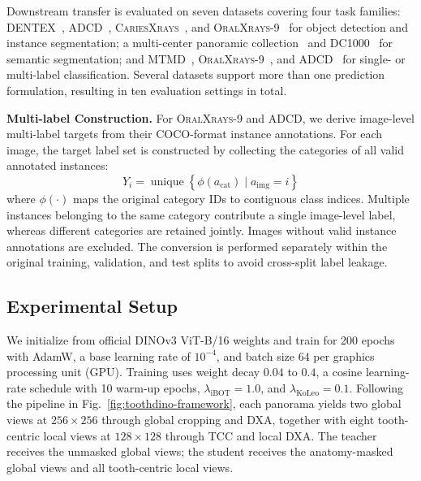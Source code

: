 \documentclass[conference]{IEEEtran}
\newcommand{\DXA}{\textsc{DXA}}
\newcommand{\TCC}{\textsc{TCC}}
\newcommand{\dataset}[1]{\textsc{#1}}
\begin{document}
Downstream transfer is evaluated on seven datasets covering four task families: \dataset{DENTEX}~\cite{hamamci2023dentex}, \dataset{ADCD}~\cite{muresanu2024adcd}, \dataset{CariesXrays}~\cite{chen2024cariesxrays}, and \dataset{OralXrays-9}~\cite{chen2025OralXrays} for object detection and instance segmentation; a multi-center panoramic collection~\cite{li2024multicenter} and \dataset{DC1000}~\cite{wang2023multi} for semantic segmentation; and \dataset{MTMD}~\cite{mtm_mendeley}, \dataset{OralXrays-9}~\cite{chen2025OralXrays}, and \dataset{ADCD}~\cite{muresanu2024adcd} for single- or multi-label classification. Several datasets support more than one prediction formulation, resulting in ten evaluation settings in total.


\textbf{Multi-label Construction.}
For \dataset{OralXrays-9} and \dataset{ADCD}, we derive image-level
multi-label targets from their COCO-format instance annotations. For
each image, the target label set is constructed by collecting the
categories of all valid annotated instances:
\begin{equation}
Y_i=
\operatorname{unique}
\left\{
\phi(a_{\mathrm{cat}})
\mid
a_{\mathrm{img}}=i
\right\}
\label{eq:multilabel-construction}
\end{equation}
where $\phi(\cdot)$ maps the original category IDs to contiguous class
indices. Multiple instances belonging to the same category contribute
a single image-level label, whereas different categories are retained
jointly. Images without valid instance annotations are excluded. The
conversion is performed separately within the original training,
validation, and test splits to avoid cross-split label leakage.



\subsection{Experimental Setup}
\label{sec:experimental-setup}

We initialize from official DINOv3 ViT-B/16 weights \cite{simeoni2025dinov3} and train for 200 epochs with AdamW, a base learning rate of $10^{-4}$, and batch size $64$ per graphics processing unit (GPU). Training uses weight decay $0.04$ to $0.4$, a cosine learning-rate schedule with 10 warm-up epochs, $\lambda_{\mathrm{iBOT}}=1.0$, and $\lambda_{\mathrm{KoLeo}}=0.1$. Following the pipeline in Fig.~\ref{fig:toothdino-framework}, each panorama yields two global views at $256\times256$ through global cropping and \DXA{}, together with eight tooth-centric local views at $128\times128$ through \TCC{} and local \DXA{}. The teacher receives the unmasked global views; the student receives the anatomy-masked global views and all tooth-centric local views.
\end{document}
